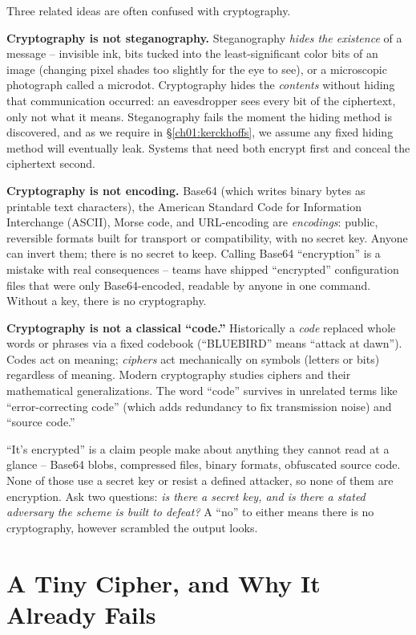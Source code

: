 Three related ideas are often confused with cryptography.

\textbf{Cryptography is not steganography.} Steganography \emph{hides the existence} of a message -- invisible ink, bits tucked into the least-significant color bits of an image (changing pixel shades too slightly for the eye to see), or a microscopic photograph called a microdot. Cryptography hides the \emph{contents} without hiding that communication occurred: an eavesdropper sees every bit of the ciphertext, only not what it means. Steganography fails the moment the hiding method is discovered, and as we require in \S\ref{ch01:kerckhoffs}, we assume any fixed hiding method will eventually leak. Systems that need both encrypt first and conceal the ciphertext second.

\textbf{Cryptography is not encoding.} Base64 (which writes binary bytes as printable text characters), the American Standard Code for Information Interchange (ASCII), Morse code, and URL-encoding are \emph{encodings}: public, reversible formats built for transport or compatibility, with no secret key. Anyone can invert them; there is no secret to keep. Calling Base64 ``encryption'' is a mistake with real consequences -- teams have shipped ``encrypted'' configuration files that were only Base64-encoded, readable by anyone in one command. Without a key, there is no cryptography.

\textbf{Cryptography is not a classical ``code.''} Historically a \emph{code} replaced whole words or phrases via a fixed codebook (``BLUEBIRD'' means ``attack at dawn''). Codes act on meaning; \emph{ciphers} act mechanically on symbols (letters or bits) regardless of meaning. Modern cryptography studies ciphers and their mathematical generalizations. The word ``code'' survives in unrelated terms like ``error-correcting code'' (which adds redundancy to fix transmission noise) and ``source code.''

\begin{trapbox}
``It's encrypted'' is a claim people make about anything they cannot read at a glance -- Base64 blobs, compressed files, binary formats, obfuscated source code. None of those use a secret key or resist a defined attacker, so none of them are encryption. Ask two questions: \emph{is there a secret key, and is there a stated adversary the scheme is built to defeat?} A ``no'' to either means there is no cryptography, however scrambled the output looks.
\end{trapbox}

\section{A Tiny Cipher, and Why It Already Fails}
\label{ch01:tiny-cipher}

